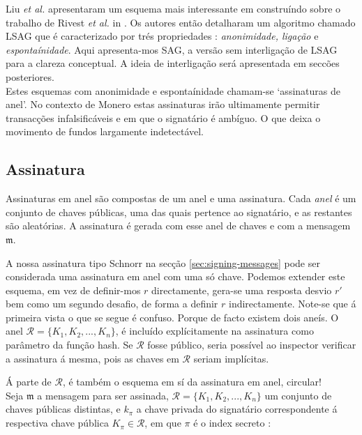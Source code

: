 Liu {\em et al.} apresentaram um esquema mais interessante em \cite{Liu2004} construíndo sobre o trabalho de Rivest {\em et al.} in \cite{rivest-leak-secret}. Os autores então detalharam um algoritmo chamado LSAG que é caracterizado por trés propriedades : {\em anonimidade, ligação} e {\em espontaínidade}. Aqui apresenta-mos SAG, a versão sem interligação de LSAG para a clareza conceptual. A ideia de interligação será apresentada em seccões posteriores.
\\

Estes esquemas com anonimidade e espontaínidade chamam-se `assinaturas de anel'. No contexto de Monero estas assinaturas irão ultimamente permitir transacções infalsificáveis e em que o signatário é ambíguo. O que deixa o movimento de fundos largamente indetectável.

\subsection*{Assinatura}

Assinaturas em anel são compostas de um anel e uma assinatura. Cada {\em anel} é um conjunto de chaves públicas, uma das quais pertence ao signatário, e as restantes são aleatórias. A assinatura é gerada com esse anel de chaves e com a mensagem $\mathfrak{m}$.

A nossa assinatura tipo Schnorr na secção \ref{sec:signing-messages} pode ser considerada uma assinatura em anel com uma só chave. Podemos extender este esquema, em vez de definir-mos $r$ directamente, gera-se uma resposta desvio $r'$ bem como um segundo desafio, de forma a definir $r$ indirectamente. Note-se que á primeira vista o que se segue é confuso. Porque de facto existem dois aneís. O anel \(\mathcal{R} = \{K_1, K_2, ..., K_n\}\), é incluído explícitamente na assinatura como parâmetro da função hash. Se $\mathcal{R}$ fosse público, seria possível ao inspector verificar a assinatura á mesma, pois as chaves em $\mathcal{R}$ seriam implícitas.

Á parte de $\mathcal{R}$, é também o esquema em sí da assinatura em anel, circular!
\\

Seja \(\mathfrak{m}\) a mensagem para ser assinada, \(\mathcal{R} = \{K_1, K_2, ..., K_n\}\) um conjunto de chaves públicas distintas, e \(k_\pi\) a chave privada do signatário correspondente á respectiva chave pública \(K_\pi \in \mathcal{R}\), em que $\pi$ é o index secreto :

